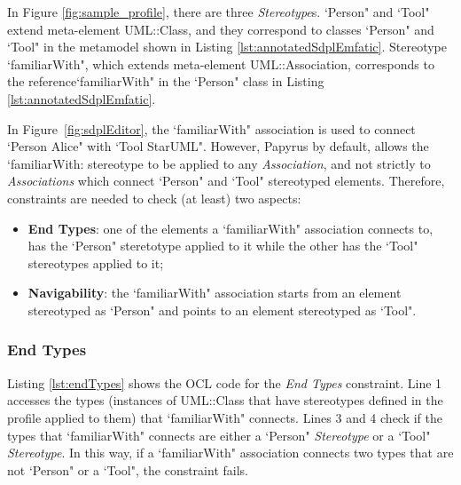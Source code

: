 In Figure \ref{fig:sample_profile}, there are three \textit{Stereotype}s. `Person" and `Tool" extend meta-element UML::Class, and they correspond to classes `Person" and `Tool" in the metamodel shown in Listing \ref{lst:annotatedSdplEmfatic}. 
Stereotype `familiarWith", which extends meta-element UML::Association, corresponds to the reference`familiarWith" in the `Person" class in Listing \ref{lst:annotatedSdplEmfatic}.

In Figure~\ref{fig:sdplEditor}, the `familiarWith" association is used to connect `Person Alice" with `Tool StarUML". 
However, Papyrus by default, allows the `familiarWith: stereotype to be applied to any \emph{Association}, and not strictly to \emph{Associations} which connect `Person" and `Tool" stereotyped elements. 
Therefore, constraints are needed to check (at least) two aspects:

\begin{itemize}
	\item \textbf{End Types}: one of the elements a `familiarWith" association connects to, has the `Person" steretotype applied to it while the other has the `Tool" stereotypes applied to it;
	\item \textbf{Navigability}: the `familiarWith" association starts from an element stereotyped as `Person" and points to an element stereotyped as `Tool".
\end{itemize}

\subsubsection{End Types}
Listing \ref{lst:endTypes} shows the OCL code for the \emph{End Types} constraint. 
Line 1 accesses the types (instances of UML::Class that have stereotypes defined in the profile applied to them) that `familiarWith" connects. 
Lines 3 and 4 check if the types that `familiarWith" connects are either a `Person" \textit{Stereotype} or a `Tool" \textit{Stereotype}. 
In this way, if a `familiarWith" association connects two types that are not `Person" or a `Tool", the constraint fails.




